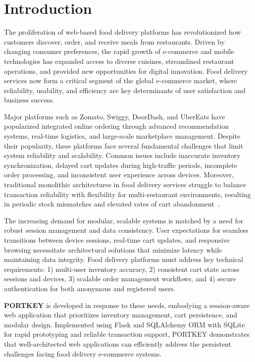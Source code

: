 \section{Introduction}
\label{sec:intro}

The proliferation of web-based food delivery platforms has revolutionized how customers discover, order, and receive meals from restaurants. Driven by changing consumer preferences, the rapid growth of e-commerce and mobile technologies has expanded access to diverse cuisines, streamlined restaurant operations, and provided new opportunities for digital innovation. Food delivery services now form a critical segment of the global e-commerce market, where reliability, usability, and efficiency are key determinants of user satisfaction and business success.

Major platforms such as Zomato, Swiggy, DoorDash, and UberEats have popularized integrated online ordering through advanced recommendation systems, real-time logistics, and large-scale marketplace management. Despite their popularity, these platforms face several fundamental challenges that limit system reliability and scalability. Common issues include inaccurate inventory synchronization, delayed cart updates during high-traffic periods, incomplete order processing, and inconsistent user experience across devices. Moreover, traditional monolithic architectures in food delivery services struggle to balance transaction reliability with flexibility for multi-restaurant environments, resulting in periodic stock mismatches and elevated rates of cart abandonment~\cite{b1}.

The increasing demand for modular, scalable systems is matched by a need for robust session management and data consistency. User expectations for seamless transitions between device sessions, real-time cart updates, and responsive browsing necessitate architectural solutions that minimize latency while maintaining data integrity. Food delivery platforms must address key technical requirements: 1) multi-user inventory accuracy, 2) consistent cart state across sessions and devices, 3) scalable order management workflows, and 4) secure authentication for both anonymous and registered users.

\textbf{PORTKEY} is developed in response to these needs, embodying a session-aware web application that prioritizes inventory management, cart persistence, and modular design. Implemented using Flask and SQLAlchemy ORM with SQLite for rapid prototyping and reliable transaction support, PORTKEY demonstrates that well-architected web applications can efficiently address the persistent challenges facing food delivery e-commerce systems.

